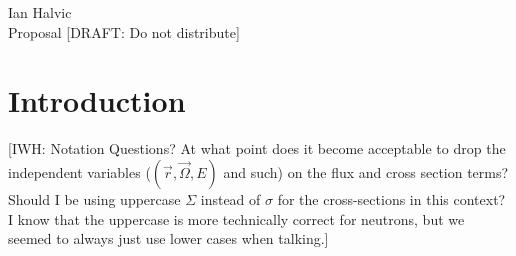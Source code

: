 \documentclass{article}
\newcommand{\vr}{\vec{r}}
\newcommand{\vO}{\vec{\Omega}}
\begin{document}
\begin{center}
Ian Halvic \\
Proposal 
{\color{red}[DRAFT: Do not distribute]} \\
\end{center}


\section{Introduction}
{\color{red}[IWH: Notation Questions? At what point does it become acceptable to drop the independent variables ($(\vr,\vO,E)$ and such) on the flux and cross section terms? Should I be using uppercase $\Sigma$ instead of $\sigma$ for the cross-sections in this context? I know that the uppercase is more technically correct for neutrons, but we seemed to always just use lower cases when talking.]}
\end{document}
